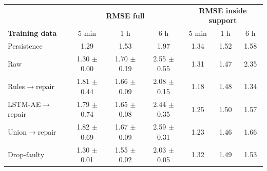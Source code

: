 \noindent\begin{minipage}{\textwidth}
\begin{center}
\footnotesize
{}
\label{tab:residual}
\setlength{\tabcolsep}{5pt}
\begin{tabular}{lccc|ccc}
\toprule
 & \multicolumn{3}{c|}{\textbf{RMSE full}} & \multicolumn{3}{c}{\textbf{RMSE inside support}} \\
\textbf{Training data} & 5 min & 1 h & 6 h & 5 min & 1 h & 6 h \\
\midrule
Persistence & 1.29 & 1.53 & 1.97 & 1.34 & 1.52 & 1.58 \\
Raw & 1.30 $\pm$ 0.00 & 1.70 $\pm$ 0.19 & 2.55 $\pm$ 0.55 & 1.31 & 1.47 & 2.35 \\
Rules$\rightarrow$repair & 1.81 $\pm$ 0.44 & 1.66 $\pm$ 0.09 & 2.08 $\pm$ 0.15 & 1.18 & 1.48 & 1.34 \\
LSTM-AE$\rightarrow$repair & 1.79 $\pm$ 0.74 & 1.65 $\pm$ 0.08 & 2.44 $\pm$ 0.35 & 1.25 & 1.50 & 1.57 \\
Union$\rightarrow$repair & 1.82 $\pm$ 0.69 & 1.67 $\pm$ 0.09 & 2.59 $\pm$ 0.31 & 1.23 & 1.46 & 1.66 \\
Drop-faulty & 1.30 $\pm$ 0.01 & 1.55 $\pm$ 0.02 & 2.03 $\pm$ 0.05 & 1.32 & 1.49 & 1.53 \\
\bottomrule
\end{tabular}
\end{center}
\end{minipage}
\vspace{10pt}
